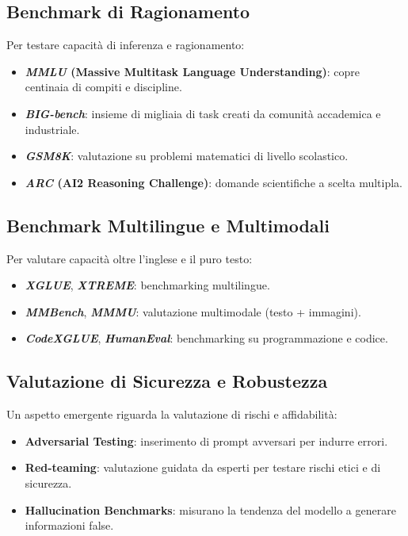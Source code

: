 \subsection{Benchmark di Ragionamento}
Per testare capacità di inferenza e ragionamento:
\begin{itemize}
    \item \textbf{\textit{MMLU} (Massive Multitask Language Understanding)}: copre centinaia di compiti e discipline.
    \item \textbf{\textit{BIG-bench}}: insieme di migliaia di task creati da comunità accademica e industriale.
    \item \textbf{\textit{GSM8K}}: valutazione su problemi matematici di livello scolastico.
    \item \textbf{\textit{ARC} (AI2 Reasoning Challenge)}: domande scientifiche a scelta multipla.
\end{itemize}

\subsection{Benchmark Multilingue e Multimodali}
Per valutare capacità oltre l'inglese e il puro testo:
\begin{itemize}
    \item \textbf{\textit{XGLUE}}, \textbf{\textit{XTREME}}: benchmarking multilingue.
    \item \textbf{\textit{MMBench}}, \textbf{\textit{MMMU}}: valutazione multimodale (testo + immagini).
    \item \textbf{\textit{CodeXGLUE}}, \textbf{\textit{HumanEval}}: benchmarking su programmazione e codice.
\end{itemize}

\subsection{Valutazione di Sicurezza e Robustezza}
Un aspetto emergente riguarda la valutazione di rischi e affidabilità:
\begin{itemize}
    \item \textbf{Adversarial Testing}: inserimento di prompt avversari per indurre errori.
    \item \textbf{Red-teaming}: valutazione guidata da esperti per testare rischi etici e di sicurezza.
    \item \textbf{Hallucination Benchmarks}: misurano la tendenza del modello a generare informazioni false.
\end{itemize}

